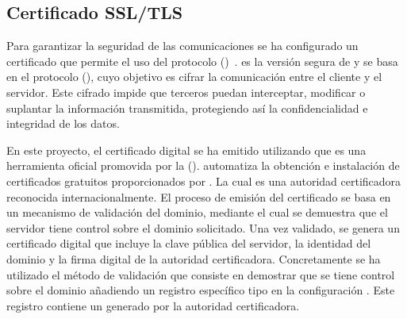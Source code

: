 \subsection{Certificado SSL/TLS}\label{https}
Para garantizar la seguridad de las comunicaciones se ha configurado un certificado  que permite el uso del protocolo  ()~\cite{herramienta:HTTPvsHTTPS}.  es la versión segura de  y se basa en el protocolo  (), cuyo objetivo es cifrar la comunicación entre el cliente y el servidor. Este cifrado impide que terceros puedan interceptar, modificar o suplantar la información transmitida, protegiendo así la confidencialidad e integridad de los datos.

En este proyecto, el certificado digital se ha emitido utilizando  que es una herramienta oficial promovida por la  ().  automatiza la obtención e instalación de certificados gratuitos proporcionados por . La cual es una autoridad certificadora reconocida internacionalmente. El proceso de emisión del certificado se basa en un mecanismo de validación del dominio, mediante el cual se demuestra que el servidor tiene control sobre el dominio solicitado. Una vez validado, se genera un certificado digital que incluye la clave pública del servidor, la identidad del dominio y la firma digital de la autoridad certificadora. Concretamente se ha utilizado el método de validación  que consiste en demostrar que se tiene control sobre el dominio añadiendo un registro específico tipo  en la configuración . Este registro contiene un  generado por la autoridad certificadora.